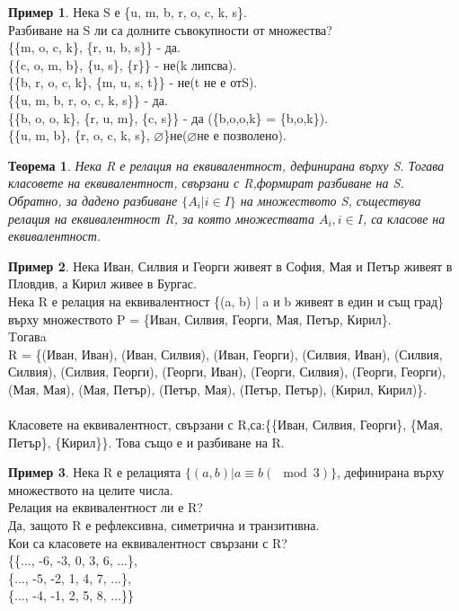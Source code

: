 \documentclass[fleqn, 12pt]{article}
\newtheorem{theorem}{Теорема}[subsection]
\theoremstyle{definition}
\newtheorem{example}{Пример}[subsection]
\begin{document}
\begin{example}
Нека S е \{u, m, b, r, o, c, k, s\}.\\
Разбиване на S ли са долните съвокупности от множества?\\
\{\{m, o, c, k\}, \{r, u, b, s\}\} - да.\\
\{\{c, o, m, b\}, \{u, s\}, \{r\}\} - не(k липсва).\\
\{\{b, r, o, c, k\}, \{m, u, s, t\}\} - не(t не е отS).\\
\{\{u, m, b, r, o, c, k, s\}\} - да.\\
\{\{b, o, o, k\}, \{r, u, m\}, \{c, s\}\} - да (\{b,o,o,k\} = \{b,o,k\}).\\
\{\{u, m, b\}, \{r, o, c, k, s\}, $\varnothing$\}не($\varnothing$не е позволено).
\end{example}

\begin{theorem}
Нека R е релация на еквивалентност, дефинирана върху S. Тогава класовете на еквивалентност, свързани с R,формират разбиване на S.\\
Обратно, за дадено разбиване $\{A_i | i \in I\}$ на множеството S, съществува релация на еквивалентност R, за която множествата $A_i, i \in I$, са класове на еквивалентност.
\end{theorem}

\begin{example}
Нека Иван, Силвия и Георги живеят в  София, Мая и Петър  живеят в Пловдив, а Кирил живее в Бургас. \\
Нека R е релация на еквивалентност \{(a, b) | a и b живеят в един и същ град\} върху множеството P = \{Иван, Силвия,   Георги, Мая,  Петър, Кирил\}.\\
Tогавa \\
R = \{(Иван, Иван),\;
(Иван, Силвия),\;
(Иван, Георги),\;
(Силвия, Иван),\;
(Силвия, Силвия),\;
(Силвия, Георги),\;
(Георги, Иван),\;
(Георги, Силвия),\;
(Георги, Георги),\;
(Мая, Мая), \;
(Мая, Петър), \;
(Петър, Мая),\;
(Петър, Петър),\;
(Кирил, Кирил)\}.\\
\\
Класовете на еквивалентност, свързани с R,са:\{\{Иван, Силвия, Георги\},\; \{Мая,  Петър\},\; \{Кирил\}\}. Това също е и разбиване на R.

\end{example}

\begin{example}
Нека R е релацията $\{(a, b) | a \equiv b (\mod 3)\}$, дефинирана върху множеството на целите числа.\\
Релация на еквивалентност ли е R?\\
Да, защото R е рефлексивна, симетрична и транзитивна. \\
Кои са класовете на еквивалентност свързани с R?\\
\{\{..., -6,   -3, 0, 3, 6, ...\},\\
\{..., -5,   -2, 1, 4, 7, ...\},\\
\{..., -4,   -1, 2, 5, 8, ...\}\}
\end{example}
\end{document}
